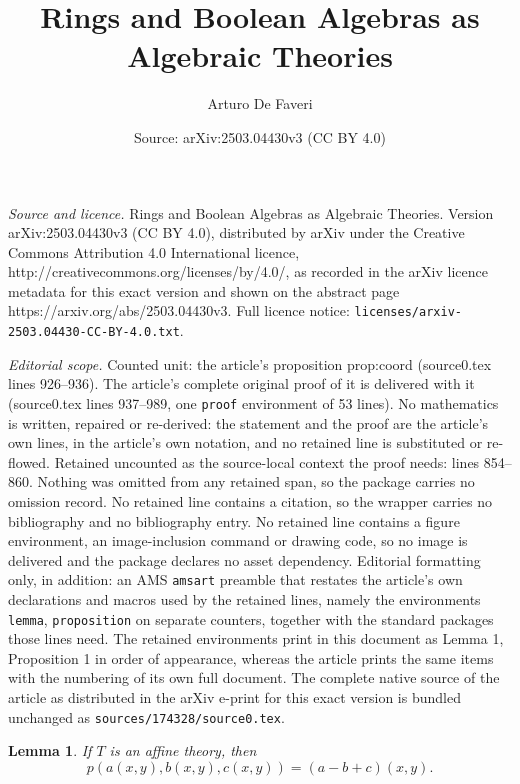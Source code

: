 \documentclass[10pt,a4paper]{amsart}
\title{Rings and Boolean Algebras as Algebraic Theories}
\author{Arturo De Faveri}
\date{Source: arXiv:2503.04430v3 (CC BY 4.0)}
\newtheorem{lemma}{Lemma}
\begin{document}
\maketitle

\noindent\emph{Source and licence.} Rings and Boolean Algebras as Algebraic Theories. Version arXiv:2503.04430v3 (CC BY 4.0), distributed by arXiv under the Creative Commons Attribution 4.0 International licence, http://creativecommons.org/licenses/by/4.0/, as recorded in the arXiv licence metadata for this exact version and shown on the abstract page https://arxiv.org/abs/2503.04430v3. Full licence notice: \texttt{licenses/arxiv-2503.04430-CC-BY-4.0.txt}.\par\smallskip

\noindent\textit{Editorial scope.} Counted unit: the article's proposition prop:coord (source0.tex lines 926--936). The article's complete original proof of it is delivered with it (source0.tex lines 937--989, one \texttt{proof} environment of 53 lines). No mathematics is written, repaired or re-derived: the statement and the proof are the article's own lines, in the article's own notation, and no retained line is substituted or re-flowed.  Retained uncounted as the source-local context the proof needs: lines 854--860.  Nothing was omitted from any retained span, so the package carries no omission record.  No retained line contains a citation, so the wrapper carries no bibliography and no bibliography entry.  No retained line contains a figure environment, an image-inclusion command or drawing code, so no image is delivered and the package declares no asset dependency.  Editorial formatting only, in addition: an AMS \texttt{amsart} preamble that restates the article's own declarations and macros used by the retained lines, namely the environments \texttt{lemma}, \texttt{proposition} on separate counters, together with the standard packages those lines need.  The retained environments print in this document as Lemma 1, Proposition 1 in order of appearance, whereas the article prints the same items with the numbering of its own full document.  The complete native source of the article as distributed in the arXiv e-print for this exact version is bundled unchanged as \texttt{sources/174328/source0.tex}.
\begin{lemma}
  \label{lem:pl}
  If $T$ is an affine theory, then 
  \begin{equation*}
    p(a(x,y), b(x,y), c(x,y))=(a-b+c)(x,y)\text{.}
  \end{equation*}
\end{lemma}
\end{document}
